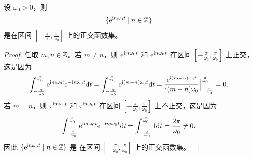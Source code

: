 \begin{example}[指数函数集]
    设 $\omega_0 > 0$，则
    \begin{align*}
        \{\mathrm{e}^{\mathrm{i} n\omega_0t} \mid n \in \mathbb{Z}\}
    \end{align*}
    是在区间 $[-\frac{\pi}{\omega_0}, \frac{\pi}{\omega_0}]$ 上的正交函数集。
\end{example}

\begin{proof}
    任取 $m, n \in \mathbb{Z}$。若 $m \neq n$，则 $\mathrm{e}^{\mathrm{i} m\omega_0t}$ 和 $\mathrm{e}^{\mathrm{i} n\omega_0t}$
    在区间 $[-\frac{\pi}{\omega_0}, \frac{\pi}{\omega_0}]$ 上正交，这是因为
    \begin{align*}
        \int_{-\frac{\pi}{\omega_0}}^{\frac{\pi}{\omega_0}}\mathrm{e}^{\mathrm{i} m\omega_0t}\mathrm{e}^{-\mathrm{i} n\omega_0t}\mathrm{d}t
        = \int_{-\frac{\pi}{\omega_0}}^{\frac{\pi}{\omega_0}}\mathrm{e}^{\mathrm{i} (m - n)\omega_0t}\mathrm{d}t
        = \frac{\mathrm{e}^{\mathrm{i} (m - n)\omega_0t}}{\mathrm{i} (m - n)\omega_0}\Big|_{-\frac{\pi}{\omega_0}}^{\frac{\pi}{\omega_0}}
        = 0.
    \end{align*}
    若 $m = n$，则 $\mathrm{e}^{\mathrm{i} m\omega_0t}$ 和 $\mathrm{e}^{\mathrm{i} n\omega_0t}$
    在区间 $[-\frac{\pi}{\omega_0}, \frac{\pi}{\omega_0}]$ 上不正交，这是因为
    \begin{align*}
        \int_{-\frac{\pi}{\omega_0}}^{\frac{\pi}{\omega_0}}\mathrm{e}^{\mathrm{i} m\omega_0t}\mathrm{e}^{-\mathrm{i} m\omega_0t}\mathrm{d}t
        = \int_{-\frac{\pi}{\omega_0}}^{\frac{\pi}{\omega_0}}1\mathrm{d}t
        = \frac{2\pi}{\omega_0} \neq 0.
    \end{align*}
    因此 $\{\mathrm{e}^{\mathrm{i} n\omega_0t} \mid n \in \mathbb{Z}\}$ 是
    在区间 $[-\frac{\pi}{\omega_0}, \frac{\pi}{\omega_0}]$ 上的正交函数集。
\end{proof}



